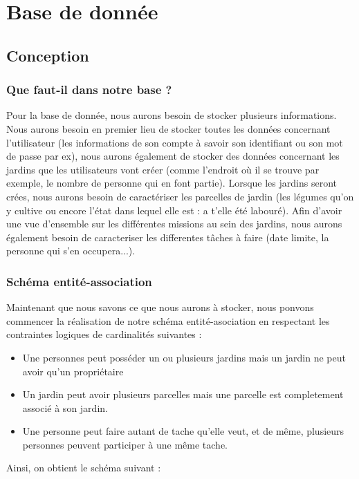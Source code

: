 \documentclass[french,a4paper]{article}
\begin{document}
\section{Base de donnée}
\subsection{Conception}
\subsubsection{Que faut-il dans notre base ?}
Pour la base de donnée, nous aurons besoin de stocker plusieurs informations. Nous aurons besoin en premier lieu de stocker 
toutes les données concernant l'utilisateur (les informations de son compte à savoir son identifiant ou son mot de passe par ex), nous
aurons également de stocker des données concernant les jardins que les utilisateurs vont créer (comme l'endroit où il se trouve par exemple, 
le nombre de personne qui en font partie). Lorsque les jardins seront crées, nous aurons besoin de caractériser les parcelles de jardin 
(les légumes qu'on y cultive ou encore l'état dans lequel elle est : a t'elle été labouré). Afin d'avoir une vue d'ensemble sur les 
différentes missions au sein des jardins, nous aurons également besoin de caracteriser les differentes tâches à faire (date limite,
la personne qui s'en occupera...). 
\subsubsection{Schéma entité-association}

Maintenant que nous savons ce que nous aurons à stocker, nous ponvons commencer la réalisation de notre schéma entité-asociation
en respectant les contraintes logiques de cardinalités suivantes : 
\begin{itemize}
    \item Une personnes peut posséder un ou plusieurs jardins mais un jardin ne peut avoir qu'un propriétaire
    \item Un jardin peut avoir plusieurs parcelles mais une parcelle est completement associé à son jardin.
    \item Une personne peut faire autant de tache qu'elle veut, et de même, plusieurs personnes peuvent participer à une même tache.
\end{itemize}
Ainsi, on obtient le schéma suivant : 
\end{document}

